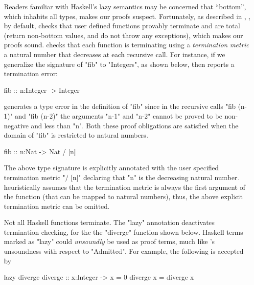 %
Readers familiar with Haskell's lazy 
semantics may be concerned that ``bottom'', 
which inhabits all types, makes our proofs suspect.
%
Fortunately, as described in \citet{Vazou14}, \toolname, 
by default, checks that user defined functions 
provably terminate and are total (\ie return non-bottom values, 
and do not throw any exceptions),
which makes our proofs sound.
%
\toolname checks that each function is terminating using 
a \textit{termination metric} 
\ie a natural number that decreases at each recursive call. 
%
For instance, if we generalize the signature 
of "fib" to "Integers", as shown below, then 
\toolname reports a termination error: 
%
\begin{mcode}
    fib :: n:Integer -> Integer
\end{mcode}
%
\toolname generates a type error in the definition of "fib" since in 
the recursive calls "fib (n-1)" and "fib (n-2)"
the arguments "n-1" and "n-2"
cannot be proved to be non-negative and less than "n".
%
Both these proof obligations are satisfied when 
the domain of "fib" is restricted to natural numbers. 
%
\begin{mcode}
    fib :: n:Nat -> Nat / [n]
\end{mcode}
%
The above type signature is explicitly annotated 
with the user specified termination metric "/ [n]"
declaring that "n" is the decreasing natural number. 
% 
\toolname heuristically assumes that the termination metric 
is always the first argument of the function (that can be mapped to natural numbers),
thus, the above explicit termination metric can be omitted. 

Not all Haskell functions terminate. 
%
The "lazy" annotation 
deactivates termination 
checking, \eg for the 
the "diverge" function 
shown below.
%
Haskell terms marked as "lazy" 
could \emph{unsoundly} be used 
as proof terms, much like \coq's 
unsoundness with respect to "Admitted". 
%
For example, the following is 
accepted by \toolname 
%
\begin{mcode}
    lazy diverge 
    diverge :: x:Integer -> { x = 0 }
    diverge x = diverge x 
\end{mcode}


